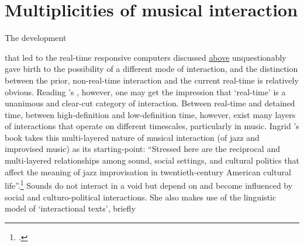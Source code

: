 



\section{Multiplicities of musical interaction }
\label{sec:mult-music-inter}


\hypertarget{sec:human-comp-inter:par8}{The development} that led to the real-time responsive computers discussed \hyperref[sec:interaction-time]{above} unquestionably gave birth to the possibility of a different mode of interaction, and the distinction between the prior, non-real-time interaction and the current real-time is relatively obvious. Reading \citeauthor{baudrillard96}'s , however, one may get the impression that `real-time' is a unanimous and clear-cut category of interaction. Between real-time and detained time, between high-definition and low-definition time, however, exist many layers of interactions that operate on different timescales, particularly in music. Ingrid \citeauthor{monson96}'s book  takes this multi-layered nature of musical interaction (of jazz and improvised music) as its starting-point: ``Stressed here are the reciprocal and multi-layered relationships among sound, social settings, and cultural politics that affect the meaning of jazz improvisation in twentieth-century American cultural life''.\footcite[2]{monson96} Sounds do not interact in a void but depend on and become influenced by social and culturo-political interactions. She also makes use of the linguistic model of `interactional texts', briefly 
